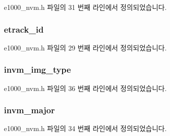 e1000\+\_\+nvm.\+h 파일의 31 번째 라인에서 정의되었습니다.

\subsubsection[{\texorpdfstring{etrack\+\_\+id}{etrack_id}}]{ etrack\+\_\+id}\hypertarget{structe1000__fw__version_a9025df95cb081ea9caf184460b72fd62}{}\label{structe1000__fw__version_a9025df95cb081ea9caf184460b72fd62}


e1000\+\_\+nvm.\+h 파일의 29 번째 라인에서 정의되었습니다.

\subsubsection[{\texorpdfstring{invm\+\_\+img\+\_\+type}{invm_img_type}}]{ invm\+\_\+img\+\_\+type}\hypertarget{structe1000__fw__version_a7fadf0ec9395ef935836b95131cc5c6d}{}\label{structe1000__fw__version_a7fadf0ec9395ef935836b95131cc5c6d}


e1000\+\_\+nvm.\+h 파일의 36 번째 라인에서 정의되었습니다.

\subsubsection[{\texorpdfstring{invm\+\_\+major}{invm_major}}]{ invm\+\_\+major}\hypertarget{structe1000__fw__version_ae8ce90a8038680a06b052cd565d9f145}{}\label{structe1000__fw__version_ae8ce90a8038680a06b052cd565d9f145}


e1000\+\_\+nvm.\+h 파일의 34 번째 라인에서 정의되었습니다.

